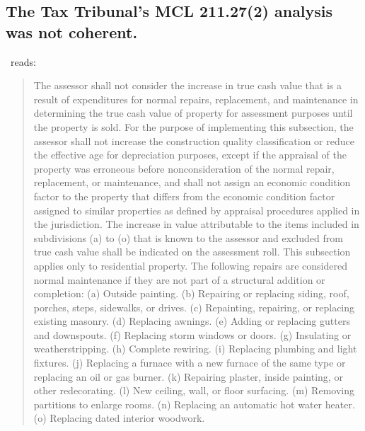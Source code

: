 \documentclass[12pt,\documentclassflag]{michiganCourtOfAppealsBrief}
\def\mathieuGast{\pincite[l]{MCL}{211.27(2)}}
\begin{document}
\subsection{The Tax Tribunal's MCL 211.27(2) analysis was not coherent.} \label{incoherent}

\mathieuGast\ reads:

\begin{quote}
  The assessor shall not consider the increase in true cash value that is a result of expenditures for normal repairs, replacement, and maintenance in determining the true cash value of property for assessment purposes until the property is sold. For the purpose of implementing this subsection, the assessor shall not increase the construction quality classification or reduce the effective age for depreciation purposes, except if the appraisal of the property was erroneous before nonconsideration of the normal repair, replacement, or maintenance, and shall not assign an economic condition factor to the property that differs from the economic condition factor assigned to similar properties as defined by appraisal procedures applied in the jurisdiction. The increase in value attributable to the items included in subdivisions (a) to (o) that is known to the assessor and excluded from true cash value shall be indicated on the assessment roll. This subsection applies only to residential property. The following repairs are considered normal maintenance if they are not part of a structural addition or completion:
(a) Outside painting. (b) Repairing or replacing siding, roof, porches, steps, sidewalks, or drives. (c) Repainting, repairing, or replacing existing masonry. (d) Replacing awnings. (e) Adding or replacing gutters and downspouts. (f) Replacing storm windows or doors. (g) Insulating or weatherstripping. (h) Complete rewiring. (i) Replacing plumbing and light fixtures. (j) Replacing a furnace with a new furnace of the same type or replacing an oil or gas burner. (k) Repairing plaster, inside painting, or other redecorating. (l) New ceiling, wall, or floor surfacing. (m) Removing partitions to enlarge rooms. (n) Replacing an automatic hot water heater. (o) Replacing dated interior woodwork.
\end{quote}
\end{document}
